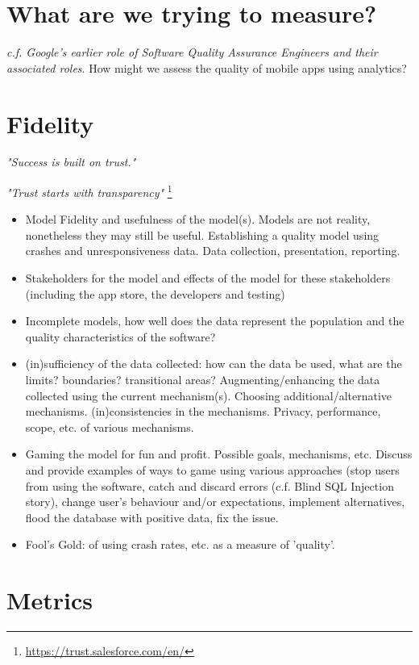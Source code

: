 \section{What are we trying to measure?}
\emph{c.f. Google's earlier role of Software Quality Assurance Engineers and their associated roles}. How might we assess the quality of mobile apps using analytics?

\section{Fidelity}
\emph{"Success is built on trust."}

\emph{"Trust starts with transparency"}
\footnote{\url{https://trust.salesforce.com/en/}}

\begin{itemize}
    \item Model Fidelity and usefulness of the model(s). Models are not reality, nonetheless they may still be useful. Establishing a quality model using crashes and unresponsiveness data. Data collection, presentation, reporting.
    \item Stakeholders for the model and effects of the model for these stakeholders (including the app store, the developers and testing)
    \item Incomplete models, how well does the data represent the population and the quality characteristics of the software?
    \item (in)sufficiency of the data collected: how can the data be used, what are the limits? boundaries? transitional areas? Augmenting/enhancing the data collected using the current mechanism(s). Choosing additional/alternative mechanisms. (in)consistencies in the mechanisms. Privacy, performance, scope, etc. of various mechanisms.
    \item Gaming the model for fun and profit. Possible goals, mechanisms, etc. Discuss and provide examples of ways to game using various approaches (stop users from using the software, catch and discard errors (c.f. Blind SQL Injection story), change user's behaviour and/or expectations, implement alternatives, flood the database with positive data, fix the issue.
    \item Fool's Gold: of using crash rates, etc. as a measure of 'quality'. 
\end{itemize}

\section{Metrics}
